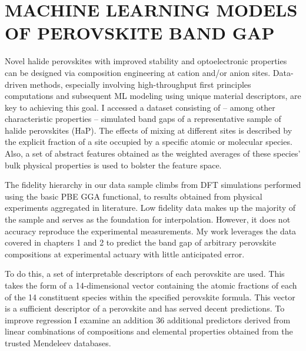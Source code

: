 \chapter{MACHINE LEARNING MODELS OF PEROVSKITE BAND GAP}
\label{sec:org432ebcc}

Novel halide perovskites with improved stability and optoelectronic properties can be designed via composition engineering at cation and/or anion sites.
Data-driven methods, especially involving high-throughput first principles computations and subsequent ML modeling using unique material descriptors, are key to achieving this goal.
I accessed a dataset consisting of -- among other characteristic properties -- simulated band gaps of a representative sample of halide perovskites (HaP).
The effects of mixing at different sites is described by the explicit fraction of a site occupied by a specific atomic or molecular species.
Also, a set of abstract features obtained as the weighted averages of these species' bulk physical properties is used to bolster the feature space.

The fidelity hierarchy in our data sample climbs from DFT simulations performed using the basic PBE GGA functional, to results obtained from physical experiments aggregated in literature.
\autocite{almora-2020-devic-perfor,kim-2014-cdses-nanow,swanson-2017-co-sublim}
Low fidelity data makes up the majority of the sample and serves as the foundation for interpolation.
However, it does not accuracy reproduce the experimental measurements.
My work leverages the data covered in chapters 1 and 2 to predict the band gap of arbitrary perovskite compositions at experimental actuary with little anticipated error.

To do this, a set of interpretable descriptors of each perovskite are used.
This takes the form of a 14-dimensional vector containing the atomic fractions of each of the 14 constituent species within the specified perovskite formula.
This vector is a sufficient descriptor of a perovskite and has served decent predictions.
\autocite{mannodi-kanakkithodi-2022-data-driven}
To improve regression I examine an addition 36 additional predictors derived from linear combinations of compositions and elemental properties obtained from the trusted Mendeleev databases.
\autocite{mentel-2014}

